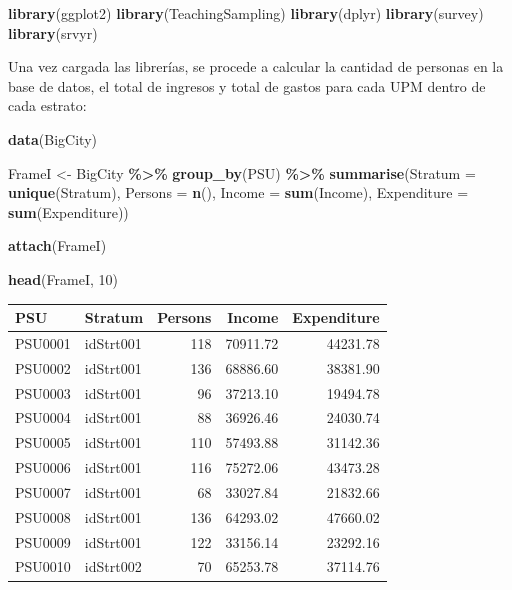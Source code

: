 \documentclass[
  12pt,
]{book}
\newenvironment{Shaded}{\begin{snugshade}}{\end{snugshade}}
\newcommand{\AttributeTok}[1]{\textcolor[rgb]{0.13,0.29,0.53}{#1}}
\newcommand{\DecValTok}[1]{\textcolor[rgb]{0.00,0.00,0.81}{#1}}
\newcommand{\FunctionTok}[1]{\textcolor[rgb]{0.13,0.29,0.53}{\textbf{#1}}}
\newcommand{\NormalTok}[1]{#1}
\newcommand{\OtherTok}[1]{\textcolor[rgb]{0.56,0.35,0.01}{#1}}
\newcommand{\SpecialCharTok}[1]{\textcolor[rgb]{0.81,0.36,0.00}{\textbf{#1}}}
\newcommand{\StringTok}[1]{\textcolor[rgb]{0.31,0.60,0.02}{#1}}
\begin{document}
\begin{Shaded}
\begin{Highlighting}[]
\FunctionTok{library}\NormalTok{(ggplot2)}
\FunctionTok{library}\NormalTok{(TeachingSampling)}
\FunctionTok{library}\NormalTok{(dplyr)}
\FunctionTok{library}\NormalTok{(survey)}
\FunctionTok{library}\NormalTok{(srvyr)}
\end{Highlighting}
\end{Shaded}

Una vez cargada las librerías, se procede a calcular la cantidad de personas en la base de datos, el total de ingresos y total de gastos para cada UPM dentro de cada estrato:

\begin{Shaded}
\begin{Highlighting}[]
\FunctionTok{data}\NormalTok{(}\StringTok{\textquotesingle{}BigCity\textquotesingle{}}\NormalTok{)}

\NormalTok{ FrameI }\OtherTok{\textless{}{-}}\NormalTok{ BigCity }\SpecialCharTok{\%\textgreater{}\%} \FunctionTok{group\_by}\NormalTok{(PSU) }\SpecialCharTok{\%\textgreater{}\%}
 \FunctionTok{summarise}\NormalTok{(}\AttributeTok{Stratum =} \FunctionTok{unique}\NormalTok{(Stratum),}
           \AttributeTok{Persons =} \FunctionTok{n}\NormalTok{(),}
           \AttributeTok{Income =} \FunctionTok{sum}\NormalTok{(Income),}
           \AttributeTok{Expenditure =} \FunctionTok{sum}\NormalTok{(Expenditure))}
             
\FunctionTok{attach}\NormalTok{(FrameI)}
\end{Highlighting}
\end{Shaded}

\begin{Shaded}
\begin{Highlighting}[]
\FunctionTok{head}\NormalTok{(FrameI, }\DecValTok{10}\NormalTok{)}
\end{Highlighting}
\end{Shaded}

\begin{tabular}{l|l|r|r|r}
\hline
PSU & Stratum & Persons & Income & Expenditure\\
\hline
PSU0001 & idStrt001 & 118 & 70911.72 & 44231.78\\
\hline
PSU0002 & idStrt001 & 136 & 68886.60 & 38381.90\\
\hline
PSU0003 & idStrt001 & 96 & 37213.10 & 19494.78\\
\hline
PSU0004 & idStrt001 & 88 & 36926.46 & 24030.74\\
\hline
PSU0005 & idStrt001 & 110 & 57493.88 & 31142.36\\
\hline
PSU0006 & idStrt001 & 116 & 75272.06 & 43473.28\\
\hline
PSU0007 & idStrt001 & 68 & 33027.84 & 21832.66\\
\hline
PSU0008 & idStrt001 & 136 & 64293.02 & 47660.02\\
\hline
PSU0009 & idStrt001 & 122 & 33156.14 & 23292.16\\
\hline
PSU0010 & idStrt002 & 70 & 65253.78 & 37114.76\\
\hline
\end{tabular}
\end{document}
